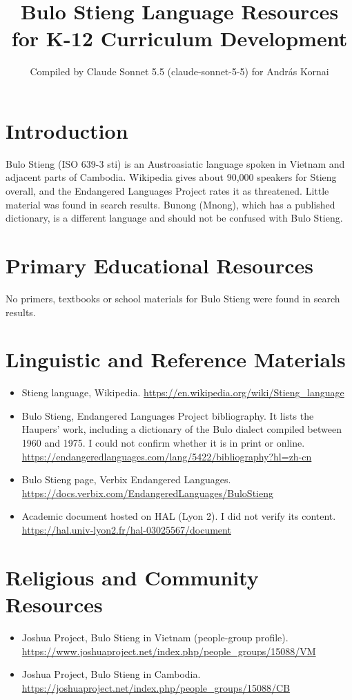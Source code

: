 \documentclass[12pt]{article}
\title{Bulo Stieng Language Resources for K-12 Curriculum Development}
\author{Compiled by Claude Sonnet 5.5 (claude-sonnet-5-5) for Andr\'as Kornai}
\date{}
\begin{document}
\maketitle

\section{Introduction}
Bulo Stieng (ISO 639-3 sti) is an Austroasiatic language spoken in Vietnam and adjacent parts of Cambodia. Wikipedia gives about 90,000 speakers for Stieng overall, and the Endangered Languages Project rates it as threatened. Little material was found in search results. Bunong (Mnong), which has a published dictionary, is a different language and should not be confused with Bulo Stieng.

\section{Primary Educational Resources}
No primers, textbooks or school materials for Bulo Stieng were found in search results.

\section{Linguistic and Reference Materials}
\begin{itemize}
\item Stieng language, Wikipedia. \url{https://en.wikipedia.org/wiki/Stieng_language}
\item Bulo Stieng, Endangered Languages Project bibliography. It lists the Haupers' work, including a dictionary of the Bulo dialect compiled between 1960 and 1975. I could not confirm whether it is in print or online. \url{https://endangeredlanguages.com/lang/5422/bibliography?hl=zh-cn}
\item Bulo Stieng page, Verbix Endangered Languages. \url{https://docs.verbix.com/EndangeredLanguages/BuloStieng}
\item Academic document hosted on HAL (Lyon 2). I did not verify its content. \url{https://hal.univ-lyon2.fr/hal-03025567/document}
\end{itemize}

\section{Religious and Community Resources}
\begin{itemize}
\item Joshua Project, Bulo Stieng in Vietnam (people-group profile). \url{https://www.joshuaproject.net/index.php/people_groups/15088/VM}
\item Joshua Project, Bulo Stieng in Cambodia. \url{https://joshuaproject.net/index.php/people_groups/15088/CB}
\end{itemize}
\end{document}
